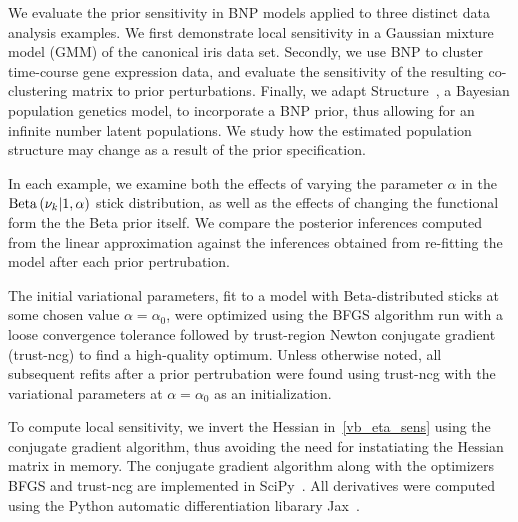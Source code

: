 We evaluate the prior sensitivity in BNP models applied to three distinct data analysis examples.
We first demonstrate local sensitivity in a Gaussian mixture model (GMM) of the canonical iris data set.
Secondly, we use BNP to cluster time-course gene expression data,
and evaluate the sensitivity of the resulting co-clustering matrix to prior perturbations.
Finally, we adapt Structure~\citep{pritchard:2000:structure}, a Bayesian population genetics model,
to incorporate a BNP prior, thus allowing for
an infinite number latent populations.
We study how the estimated population structure may change as a
result of the prior specification.

In each example, we examine both the effects of varying the parameter $\alpha$
in the $\mathrm{Beta}\left(\nu_{k} \vert 1, \alpha\right)$ stick distribution, as well as
the effects of changing the functional form the the Beta prior itself.
We compare the posterior inferences computed from the linear approximation against
the inferences obtained from re-fitting the model after each prior pertrubation.

The initial variational parameters, fit to a model
with Beta-distributed sticks at some chosen value $\alpha = \alpha_0$,
were optimized using the BFGS algorithm run with a loose convergence tolerance
followed by trust-region Newton conjugate gradient (trust-ncg) to find a high-quality optimum.
Unless otherwise noted, all subsequent refits after a prior pertrubation were found
using trust-ncg with the variational parameters at $\alpha = \alpha_0$ as an initialization.

To compute local sensitivity, we invert the Hessian in~\eqref{vb_eta_sens} using
the conjugate gradient algorithm, thus avoiding the need for
instatiating the Hessian matrix in memory.
The conjugate gradient algorithm along with the optimizers BFGS and trust-ncg
are implemented in SciPy~\citep{scipy}.
All derivatives were computed using the Python
automatic differentiation libarary Jax~\citep{jax2018github}.

